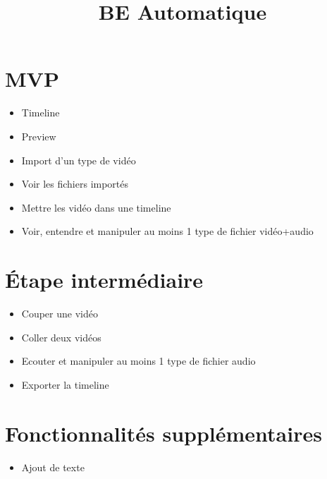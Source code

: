 \documentclass{rapport}
\title{BE Automatique} %
\begin{document}

\subject{Fonctionnalités du logiciel de montage} %



        
\buildmargins %
\buildcover %
\toc %


\section{MVP}
\begin{itemize}
    \item Timeline
    \item Preview
    \item Import d'un type de vidéo
    \item Voir les fichiers importés
    \item Mettre les vidéo dans une timeline
    \item Voir, entendre et manipuler au moins 1 type de fichier vidéo+audio 
\end{itemize}

\section{Étape intermédiaire}
\begin{itemize}
    \item Couper une vidéo
    \item Coller deux vidéos
    \item Ecouter et manipuler au moins 1 type de fichier audio
    \item Exporter la timeline 
\end{itemize}



\section{Fonctionnalités supplémentaires}
\begin{itemize}
    \item Ajout de texte
\end{itemize}
\end{document}
